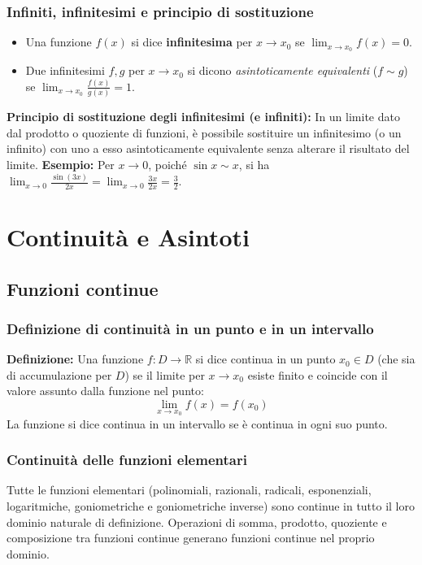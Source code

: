 \subsubsection{Infiniti, infinitesimi e principio di sostituzione}
\begin{itemize}
    \item Una funzione $f(x)$ si dice \textbf{infinitesima} per $x \to x_0$ se $\lim_{x \to x_0} f(x) = 0$.
    \item Due infinitesimi $f, g$ per $x \to x_0$ si dicono \textit{asintoticamente equivalenti} ($f \sim g$) se $\lim_{x \to x_0} \frac{f(x)}{g(x)} = 1$.
\end{itemize}
\textbf{Principio di sostituzione degli infinitesimi (e infiniti):} In un limite dato dal prodotto o quoziente di funzioni, è possibile sostituire un infinitesimo (o un infinito) con uno a esso asintoticamente equivalente senza alterare il risultato del limite. 
\textbf{Esempio:} Per $x \to 0$, poiché $\sin x \sim x$, si ha $\lim_{x \to 0} \frac{\sin(3x)}{2x} = \lim_{x \to 0} \frac{3x}{2x} = \frac{3}{2}$.

\section{Continuità e Asintoti}
\subsection{Funzioni continue}
\subsubsection{Definizione di continuità in un punto e in un intervallo}
\textbf{Definizione:} Una funzione $f: D \to \mathbb{R}$ si dice continua in un punto $x_0 \in D$ (che sia di accumulazione per $D$) se il limite per $x \to x_0$ esiste finito e coincide con il valore assunto dalla funzione nel punto:
\[ \lim_{x \to x_0} f(x) = f(x_0) \]
La funzione si dice continua in un intervallo se è continua in ogni suo punto.

\subsubsection{Continuità delle funzioni elementari}
Tutte le funzioni elementari (polinomiali, razionali, radicali, esponenziali, logaritmiche, goniometriche e goniometriche inverse) sono continue in tutto il loro dominio naturale di definizione. Operazioni di somma, prodotto, quoziente e composizione tra funzioni continue generano funzioni continue nel proprio dominio.

